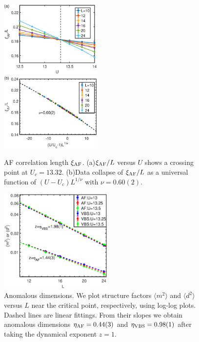 \documentclass[twocolumn,superscriptaddress]{revtex4-1}
\begin{document}
\begin{figure}
	\includegraphics[width=0.45\textwidth]{correlationlength_af}\\
	\includegraphics[width=0.45\textwidth]{datacollapse_xi}
	\caption{\label{fig:correlationlength_af} AF correlation length $\xi_{\rm AF}$. (a)$\xi_{\rm AF}/L$ versus $U$ shows a crossing point at $U_c=13.32$. (b)Data collapse of $\xi_{\rm AF}/L$ as a universal function of $(U-U_c)L^{1/\nu}$ with $\nu=0.60(2)$.}
\end{figure}

\begin{figure}
    \includegraphics[width=0.5\textwidth]{etaexponent}
    \caption{\label{fig:etaexponent}Anomalous dimensions. We plot structure factors $\langle m^2 \rangle$ and $\langle d^2 \rangle$ versus $L$ near the critical point, respectively, using log-log plots. Dashed lines are linear fittings. From their slopes we obtain anomalous dimensions $\eta_{\rm AF}=0.44(3)$ and $\eta_{\rm VBS}=0.98(1)$ after taking the dynamical exponent $z=1$. }
\end{figure}
\end{document}
